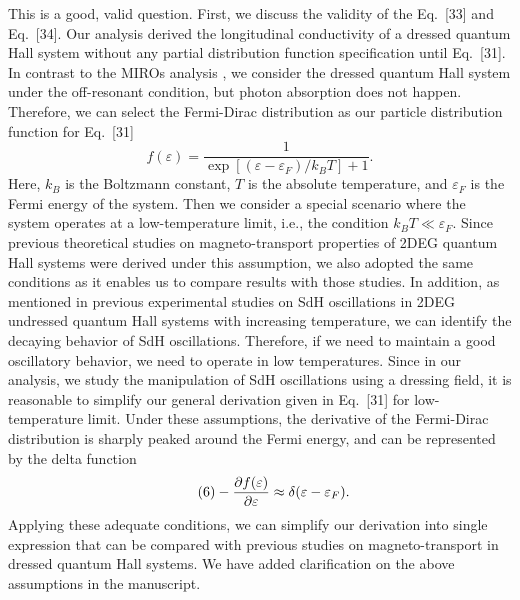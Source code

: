 \documentclass{article}
\begin{document}
This is a good, valid question. First, we discuss the validity of the Eq.~[33] and Eq.~[34]. Our analysis derived the longitudinal conductivity of a dressed quantum Hall system without any partial distribution function specification until Eq.~[31].
In contrast to the MIROs analysis \cite{dmitriev03,dmitriev05,dmitriev09}, we consider the dressed quantum Hall system under the off-resonant condition, but photon absorption does not happen. Therefore, we can select the Fermi-Dirac distribution as our particle distribution function for Eq.~[31]
\begin{equation} \tag{5}
  f(\varepsilon) = \frac{1}{\exp[(\varepsilon - \varepsilon_F)/k_B T]+1}.
\end{equation}
Here, $k_B$ is the Boltzmann constant, $T$ is the absolute temperature, and $\varepsilon_F$ is the Fermi energy of the system.
Then we consider a special scenario where the system operates at a low-temperature limit, i.e., the condition $k_BT \ll \varepsilon_F$.
Since previous theoretical studies \cite{wackerl20,dini16,endo09} on magneto-transport properties of 2DEG quantum Hall systems were derived under this assumption, we also adopted the same conditions as it enables us to compare results with those studies.
In addition, as mentioned in previous experimental studies on SdH oscillations \cite{zudov03,mani02,arapov02} in 2DEG undressed quantum Hall systems with increasing temperature, we can identify the decaying behavior of SdH oscillations.
Therefore, if we need to maintain a good oscillatory behavior, we need to operate in low temperatures.
Since in our analysis, we study the manipulation of SdH oscillations using a dressing field, it is reasonable to simplify our general derivation given in  Eq.~[31] for low-temperature limit. Under these assumptions, the derivative of the Fermi-Dirac distribution is sharply peaked around the Fermi energy, and  can be represented by the delta function \cite{endo09}
\begin{equation} \tag{6}
  - \pdv{f(\varepsilon)}{\varepsilon} \approx \delta(\varepsilon - \varepsilon_F).
\end{equation}
Applying these adequate conditions, we can simplify our derivation into single expression that can be compared with previous studies \cite{wackerl20,dini16,endo09} on
magneto-transport in dressed quantum Hall systems. We have added clarification on the above assumptions in the manuscript.
\end{document}
